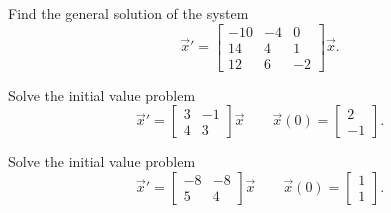 \documentclass{ximera}
\begin{document}
\begin{exercise}%
    Find the general solution of the system
    \begin{equation*}
        {\vec{x}}' = 
        \begin{bmatrix} 
            -10 & -4 & 0 \\ 
            14 & 4 & 1 \\ 
            12 & 6 & -2 
        \end{bmatrix} \vec{x}.
    \end{equation*}
\end{exercise}

\begin{exercise}
    Solve the initial value problem
    \[ 
        {\vec{x}}' = 
        \begin{bmatrix} 
            3 & -1 \\ 
            4 & 3 
        \end{bmatrix} 
        \vec{x} \qquad \vec{x}(0) = 
        \begin{bmatrix} 
            2 \\ 
            -1 
        \end{bmatrix}. 
    \]
\end{exercise}


\begin{exercise}
    Solve the initial value problem
    \[ 
        {\vec{x}}' = 
        \begin{bmatrix} 
            -8 & -8 \\ 
            5 & 4 
        \end{bmatrix} 
        \vec{x} \qquad \vec{x}(0) = 
        \begin{bmatrix} 
            1 \\ 
            1 
        \end{bmatrix}. 
    \]
\end{exercise}
\end{document}
